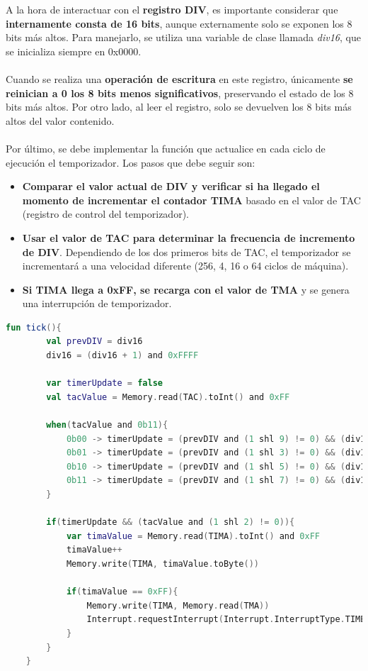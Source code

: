 A la hora de interactuar con el \textbf{registro DIV}, es importante considerar que \textbf{internamente consta de 16 bits}, aunque externamente solo se exponen los 8 bits más altos. Para manejarlo, se utiliza una variable de clase llamada \textit{div16}, que se inicializa siempre en 0x0000.
\\\\
Cuando se realiza una \textbf{operación de escritura} en este registro, únicamente \textbf{se reinician a 0 los 8 bits menos significativos}, preservando el estado de los 8 bits más altos. Por otro lado, al leer el registro, solo se devuelven los 8 bits más altos del valor contenido.
\\\\
Por último, se debe implementar la función que actualice en cada ciclo de ejecución el temporizador. Los pasos que debe seguir son:

\begin{itemize}
    \item \textbf{Comparar el valor actual de DIV y verificar si ha llegado el momento de incrementar el contador TIMA} basado en el valor de TAC (registro de control del temporizador).
    \item \textbf{Usar el valor de TAC para determinar la frecuencia de incremento de DIV}. Dependiendo de los dos primeros bits de TAC, el temporizador se incrementará a una velocidad diferente (256, 4, 16 o 64 ciclos de máquina).
    \item \textbf{Si TIMA llega a 0xFF, se recarga con el valor de TMA} y se genera una interrupción de temporizador.
\end{itemize}

\begin{lstlisting}[language=Kotlin, caption={Lectura y escritura en registros de Timers.}, label={code:timertick}]
    fun tick(){
        val prevDIV = div16
        div16 = (div16 + 1) and 0xFFFF

        var timerUpdate = false
        val tacValue = Memory.read(TAC).toInt() and 0xFF

        when(tacValue and 0b11){
            0b00 -> timerUpdate = (prevDIV and (1 shl 9) != 0) && (div16 and (1 shl 9) == 0)
            0b01 -> timerUpdate = (prevDIV and (1 shl 3) != 0) && (div16 and (1 shl 3) == 0)
            0b10 -> timerUpdate = (prevDIV and (1 shl 5) != 0) && (div16 and (1 shl 5) == 0)
            0b11 -> timerUpdate = (prevDIV and (1 shl 7) != 0) && (div16 and (1 shl 7) == 0)
        }

        if(timerUpdate && (tacValue and (1 shl 2) != 0)){
            var timaValue = Memory.read(TIMA).toInt() and 0xFF
            timaValue++
            Memory.write(TIMA, timaValue.toByte())

            if(timaValue == 0xFF){
                Memory.write(TIMA, Memory.read(TMA))
                Interrupt.requestInterrupt(Interrupt.InterruptType.TIMER.getByteMask())
            }
        }
    }
\end{lstlisting}

